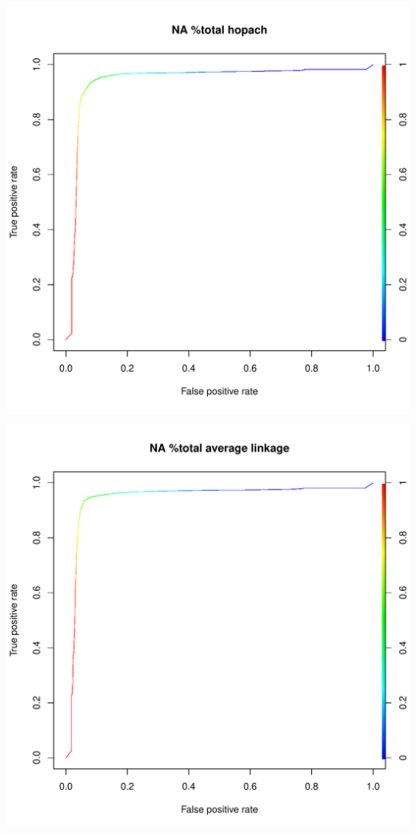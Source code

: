 \documentclass[11pt,a4paper,twoside]{report}\usepackage[]{graphicx}\usepackage[]{color}
\makeatletter
\def\maxwidth{ %
  \ifdim\Gin@nat@width>\linewidth
    \linewidth
  \else
    \Gin@nat@width
  \fi
}
\newenvironment{knitrout}{}{} %
\makeatother
\begin{document}
\begin{knitrout}
\includegraphics[width=\maxwidth]{figure/fig_code-31} 

\includegraphics[width=\maxwidth]{figure/fig_code-32} 


\end{knitrout}
\end{document}
